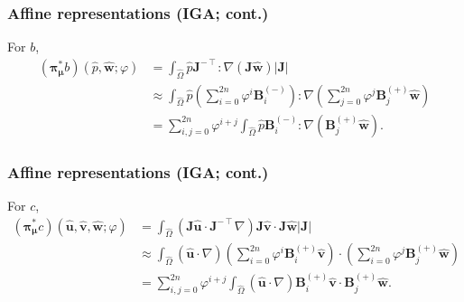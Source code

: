 \documentclass{beamer}
\begin{document}
\begin{frame}
  \frametitle{Affine representations (IGA; cont.)}

  For $b$,
  \begin{align*}
    \nonumber
    ({\bm\pi}^*_{\bm\mu}b)(
    \hat{p},
    \hat{\bm w};
    \varphi
    ) &= \int_{\hat{\Omega}} \hat{p} \bm J^{-\intercal} : \nabla (\bm J \hat{\bm w}) |\bm J| \\
    & \approx \int_{\hat{\Omega}} \hat{p}
      \left( \sum_{i=0}^{2n} \varphi^i \bm B^{(-)}_i \right) : \nabla
      \left( \sum_{j=0}^{2n} \varphi^j \bm B^{(+)}_j \hat{\bm w} \right) \\
      &= \sum_{i,j=0}^{2n} \varphi^{i+j}
        \int_{\hat{\Omega}} \hat{p} \bm B^{(-)}_i :
        \nabla \left( \bm B^{(+)}_j \hat{\bm w} \right).
  \end{align*}
\end{frame}

\begin{frame}
  \frametitle{Affine representations (IGA; cont.)}

  For $c$,
  \begin{align*}
    \nonumber
    ({\bm\pi}^*_{\bm\mu}c)(
    \hat{\bm u},
    \hat{\bm v},
    \hat{\bm w};
    \varphi
    )
    &= \int_{\hat{\Omega}} (\bm J \hat{\bm u} \cdot \bm J^{-\intercal}\nabla)
      \bm J \hat{\bm v} \cdot \bm J \hat{\bm w} |\bm J| \\
      & \approx \int_{\hat{\Omega}} (\hat{\bm u} \cdot \nabla)
      \left( \sum_{i=0}^{2n} \varphi^i \bm B^{(+)}_i \hat{\bm v} \right) \cdot
      \left( \sum_{i=0}^{2n} \varphi^j \bm B^{(+)}_j \hat{\bm w} \right) \\
    &= \sum_{i,j=0}^{2n} \varphi^{i+j}
      \int_{\hat{\Omega}} (\hat{\bm u} \cdot \nabla) \bm B^{(+)}_i \hat{\bm v} \cdot \bm B^{(+)}_j \hat{\bm w}.
  \end{align*}
\end{frame}
\end{document}
